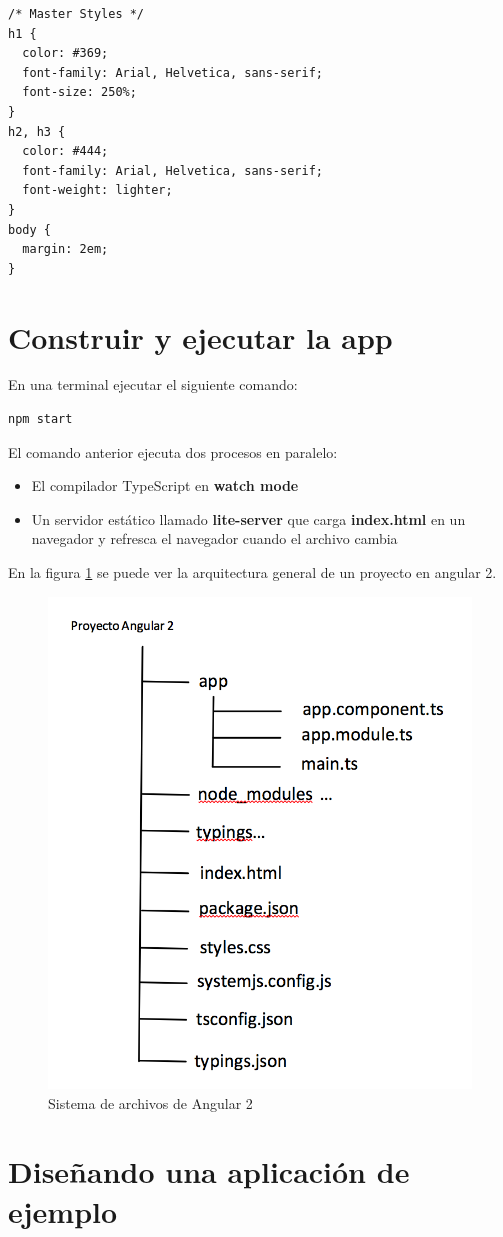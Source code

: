 \documentclass[12pt,twoside]{book}
\begin{document}
\begin{lstlisting}[language=html]
/* Master Styles */
h1 {
  color: #369;
  font-family: Arial, Helvetica, sans-serif;
  font-size: 250%;
}
h2, h3 {
  color: #444;
  font-family: Arial, Helvetica, sans-serif;
  font-weight: lighter;
}
body {
  margin: 2em;
}
\end{lstlisting}


\section{Construir y ejecutar la app}

En una terminal ejecutar el siguiente comando:

\begin{lstlisting}[language=html]
npm start
\end{lstlisting}
 El comando anterior ejecuta dos procesos en paralelo:
 
 \begin{itemize}
\item El compilador TypeScript en \textbf{watch mode}
\item Un servidor estático llamado \textbf{lite-server} que carga \textbf{index.html} en un navegador y refresca el navegador cuando el archivo cambia
\end{itemize}

En la figura \ref{fig101} se puede ver la arquitectura general de un proyecto en angular 2.

\begin{figure}
	\centering
	\includegraphics[width=0.5\linewidth]{angular.png}
	\caption{Sistema de archivos de Angular 2}
	\label{fig101}
\end{figure}

\section{Diseñando una aplicación de ejemplo}
\end{document}
